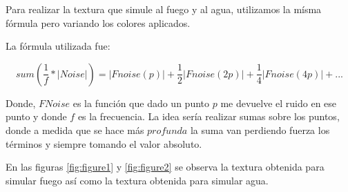 \documentclass[a4paper,10pt]{article}
\begin{document}
Para realizar la textura que simule al fuego y al agua, utilizamos la mísma
fórmula pero variando los colores aplicados.

La fórmula utilizada fue:

\begin{equation}
 sum (\frac{1}{f} * |Noise|) = |Fnoise(p)| + \frac{1}{2}|Fnoise(2p)| +
\frac{1}{4}|Fnoise(4p)| + ...
\end{equation}

Donde, $FNoise$ es la función que dado un punto $p$ me devuelve el ruido en ese
punto y donde $f$ es la frecuencia.  La idea sería realizar sumas sobre los
puntos, donde a medida que se hace más $profunda$ la suma van perdiendo fuerza
los términos y siempre tomando el valor absoluto.

En las figuras \ref{fig:figure1} y \ref{fig:figure2} se observa la textura
obtenida para simular fuego así como la textura obtenida para simular agua.
\end{document}
